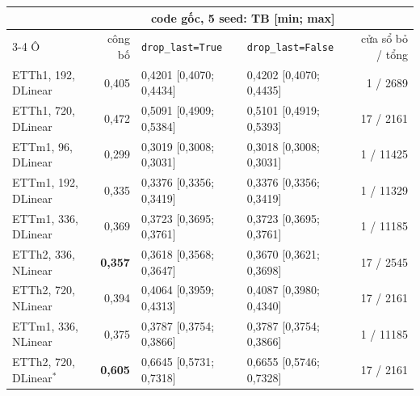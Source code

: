 \begin{tabular}{@{}l r ll r@{}}
\toprule
 & & \multicolumn{2}{c}{code gốc, 5 seed: TB [min; max]} & \\
\cmidrule(lr){3-4}
Ô & công bố & \texttt{drop\_last=True} & \texttt{drop\_last=False} & cửa sổ bỏ / tổng \\
\midrule
ETTh1, 192, DLinear & 0{,}405 & 0{,}4201 [0{,}4070; 0{,}4434] & 0{,}4202 [0{,}4070; 0{,}4435] & 1 / 2689 \\
ETTh1, 720, DLinear & 0{,}472 & 0{,}5091 [0{,}4909; 0{,}5384] & 0{,}5101 [0{,}4919; 0{,}5393] & 17 / 2161 \\
ETTm1, 96, DLinear & 0{,}299 & 0{,}3019 [0{,}3008; 0{,}3031] & 0{,}3018 [0{,}3008; 0{,}3031] & 1 / 11425 \\
ETTm1, 192, DLinear & 0{,}335 & 0{,}3376 [0{,}3356; 0{,}3419] & 0{,}3376 [0{,}3356; 0{,}3419] & 1 / 11329 \\
ETTm1, 336, DLinear & 0{,}369 & 0{,}3723 [0{,}3695; 0{,}3761] & 0{,}3723 [0{,}3695; 0{,}3761] & 1 / 11185 \\
ETTh2, 336, NLinear & \textbf{0{,}357} & 0{,}3618 [0{,}3568; 0{,}3647] & 0{,}3670 [0{,}3621; 0{,}3698] & 17 / 2545 \\
ETTh2, 720, NLinear & 0{,}394 & 0{,}4064 [0{,}3959; 0{,}4313] & 0{,}4087 [0{,}3980; 0{,}4340] & 17 / 2161 \\
ETTm1, 336, NLinear & 0{,}375 & 0{,}3787 [0{,}3754; 0{,}3866] & 0{,}3787 [0{,}3754; 0{,}3866] & 1 / 11185 \\
ETTh2, 720, DLinear$^\ast$ & \textbf{0{,}605} & 0{,}6645 [0{,}5731; 0{,}7318] & 0{,}6655 [0{,}5746; 0{,}7328] & 17 / 2161 \\
\bottomrule
\end{tabular}
